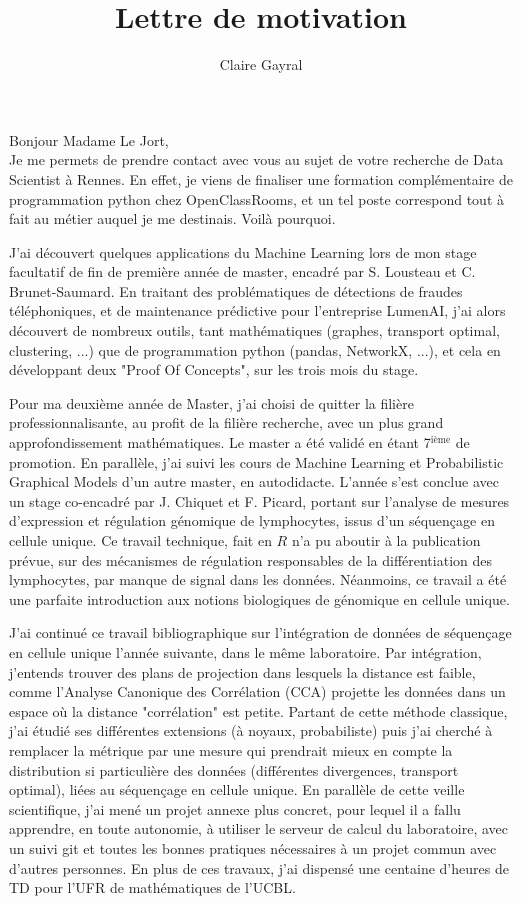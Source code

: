 \documentclass[a4paper,11pt]{article}
\title{Lettre de motivation}
\author{Claire Gayral}
\date{}
\begin{document}
Bonjour Madame Le Jort,\\

Je me permets de prendre contact avec vous au sujet de votre recherche de Data Scientist à Rennes. En effet, je viens de finaliser une formation complémentaire de programmation python chez OpenClassRooms, et un tel poste correspond tout à fait au métier auquel je me destinais. Voilà pourquoi. 

J'ai découvert quelques applications du Machine Learning lors de mon stage facultatif de fin de première année de master, encadré par S. Lousteau et C. Brunet-Saumard.
En traitant des problématiques de détections de fraudes téléphoniques, et de maintenance prédictive pour l'entreprise LumenAI, j'ai alors découvert de nombreux outils, tant mathématiques (graphes, transport optimal, clustering, ...) que de programmation python (pandas, NetworkX, ...), et cela en développant deux "Proof Of Concepts", sur les trois mois du stage.

Pour ma deuxième année de Master, j'ai choisi de quitter la filière professionnalisante, au profit de la filière recherche, avec un plus grand approfondissement mathématiques. Le master a été validé en étant 7$^{\text{ième}}$ de promotion. En parallèle, j'ai suivi les cours de Machine Learning et Probabilistic Graphical Models d'un autre master, en autodidacte. 
L'année s'est conclue avec un stage co-encadré par J. Chiquet et F. Picard, portant sur l'analyse de mesures d'expression et régulation génomique de lymphocytes, issus d'un séquençage en cellule unique. Ce travail technique, fait en $R$ n'a pu aboutir à la publication prévue, sur des mécanismes de régulation responsables de la différentiation des lymphocytes, par manque de signal dans les données. Néanmoins, ce travail a été une parfaite introduction aux notions biologiques de génomique en cellule unique. 

J'ai continué ce travail bibliographique sur l'intégration de données de séquençage en cellule unique l'année suivante, dans le même laboratoire.
%
Par intégration, j'entends trouver des plans de projection dans lesquels la distance est faible, comme l'Analyse Canonique des Corrélation (CCA) projette les données dans un espace où la distance "corrélation" est petite. Partant de cette méthode classique, j'ai étudié ses différentes extensions (à noyaux, probabiliste) puis j'ai cherché à remplacer la métrique par une mesure qui prendrait mieux en compte la distribution si particulière des données (différentes divergences, transport optimal), liées au séquençage en cellule unique. 
En parallèle de cette veille scientifique, j'ai mené un projet annexe plus concret, pour lequel il a fallu apprendre, en toute autonomie, à utiliser le serveur de calcul du laboratoire, avec un suivi git et toutes les bonnes pratiques nécessaires à un projet commun avec d'autres personnes.
En plus de ces travaux, j'ai dispensé une centaine d'heures de TD pour l'UFR de mathématiques de l'UCBL. 
\end{document}
